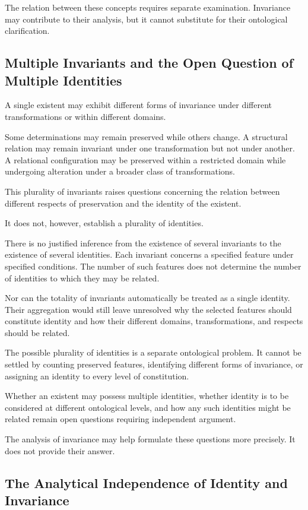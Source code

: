 The relation between these concepts requires
separate examination. Invariance may contribute
to their analysis, but it cannot substitute for
their ontological clarification.

\subsection{Multiple Invariants and the Open Question of Multiple Identities}

A single existent may exhibit different forms
of invariance under different transformations
or within different domains.

Some determinations may remain preserved while
others change. A structural relation may remain
invariant under one transformation but not under
another. A relational configuration may be
preserved within a restricted domain while
undergoing alteration under a broader class
of transformations.

This plurality of invariants raises questions
concerning the relation between different respects
of preservation and the identity of the existent.

It does not, however, establish a plurality of
identities.

There is no justified inference from the existence
of several invariants to the existence of several
identities. Each invariant concerns a specified
feature under specified conditions. The number
of such features does not determine the number
of identities to which they may be related.

Nor can the totality of invariants automatically
be treated as a single identity. Their aggregation
would still leave unresolved why the selected
features should constitute identity and how their
different domains, transformations, and respects
should be related.

The possible plurality of identities is a separate
ontological problem. It cannot be settled by
counting preserved features, identifying different
forms of invariance, or assigning an identity
to every level of constitution.

Whether an existent may possess multiple identities,
whether identity is to be considered at different
ontological levels, and how any such identities
might be related remain open questions requiring
independent argument.

The analysis of invariance may help formulate
these questions more precisely. It does not
provide their answer.

\subsection{The Analytical Independence of Identity and Invariance}

